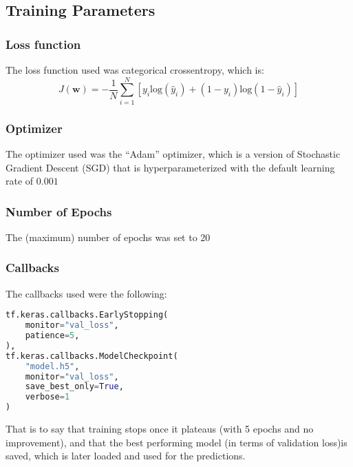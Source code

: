 \documentclass[conference]{IEEEtran}
\begin{document}
\subsection{Training Parameters}
\subsubsection{Loss function}
The loss function used was categorical crossentropy, which is:
\begin{equation}
    J(\textbf{w}) = -\frac{1}{N} \sum_{i=1}^{N} \left[ y_i \text{log}(\hat{y}_i) + (1-y_i) \text{log}(1-\hat{y}_i) \right]
\end{equation}
\subsubsection{Optimizer}
The optimizer used was the ``Adam'' optimizer, which is a version of Stochastic Gradient Descent (SGD)\cite{adam} that is hyperparameterized with the default learning rate of $0.001$
\subsubsection{Number of Epochs}
The (maximum) number of epochs was set to 20
\subsubsection{Callbacks}
The callbacks used were the following:
\begin{lstlisting}[language=Python]
tf.keras.callbacks.EarlyStopping( 
    monitor="val_loss",
    patience=5,
),
tf.keras.callbacks.ModelCheckpoint( 
    "model.h5",
    monitor="val_loss",
    save_best_only=True,
    verbose=1
)
\end{lstlisting}
That is to say that training stops once it plateaus (with 5 epochs and no improvement), and that the best performing model (in terms of validation loss)is saved, which is later loaded and used for the predictions.\@ 
\end{document}
